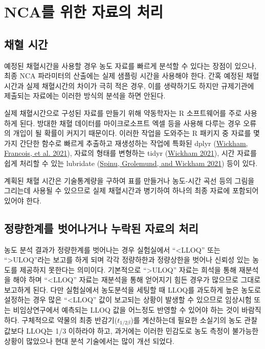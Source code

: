 \documentclass[
  11pt,
  krantz2, a4paper, twoside]{krantz}
\theoremstyle{definition}
\theoremstyle{definition}
\theoremstyle{definition}
\theoremstyle{definition}
\theoremstyle{remark}
\begin{document}
\hypertarget{data-prep}{%
\section{NCA를 위한 자료의 처리}\label{data-prep}}

\hypertarget{uxcc44uxd608-uxc2dcuxac04}{%
\subsection{채혈 시간}\label{uxcc44uxd608-uxc2dcuxac04}}

예정된 채혈시간을 사용할 경우 농도 자료를 빠르게 분석할 수 있다는 장점이 있으나, 최종 NCA 파라미터의 산출에는 실제 샘플링 시간을 사용해야 한다. 간혹 예정된 채혈시간과 실제 채혈시간의 차이가 극히 적은 경우, 이를 생략하기도 하지만 규제기관에 제출되는 자료에는 이러한 방식의 분석을 하면 안된다.

실제 채혈시간으로 구성된 자료를 만들기 위해 약동학자는 R 소프트웨어를 주로 사용하게 된다. 방대한 채혈 데이터를 마이크로소프트 엑셀 등을 사용해 다루는 경우 오류의 개입이 될 확률이 커지기 때문이다. 이러한 작업을 도와주는 R 패키지 중 자료를 몇가지 간단한 함수로 빠르게 추출하고 재생성하는 작업에 특화된 dplyr (\protect\hyperlink{ref-R-dplyr}{Wickham, Francois, et al. 2021}), 자료의 형태를 변형하는 tidyr (\protect\hyperlink{ref-R-tidyr}{Wickham 2021}), 시간 자료를 쉽게 처리할 수 있는 lubridate (\protect\hyperlink{ref-R-lubridate}{Spinu, Grolemund, and Wickham 2021}) 등이 있다. 

계획된 채혈 시간은 기술통계량을 구하여 표를 만들거나 농도-시간 곡선 등의 그림을 그리는데 사용될 수 있으므로 실제 채혈시간과 병기하여 하나의 최종 자료에 포함되어 있어야 한다.

\hypertarget{uxc815uxb7c9uxd55cuxacc4uxb97c-uxbc97uxc5b4uxb098uxac70uxb098-uxb204uxb77duxb41c-uxc790uxb8ccuxc758-uxcc98uxb9ac}{%
\subsection{정량한계를 벗어나거나 누락된 자료의 처리}\label{uxc815uxb7c9uxd55cuxacc4uxb97c-uxbc97uxc5b4uxb098uxac70uxb098-uxb204uxb77duxb41c-uxc790uxb8ccuxc758-uxcc98uxb9ac}}

농도 분석 결과가 정량한계를 벗어나는 경우 실험실에서 ``\textless LLOQ'' 또는 ``\textgreater ULOQ''라는 보고를 하게 되며 각각 정량하한과 정량상한을 벗어나 신뢰성 있는 농도를 제공하지 못한다는 의미이다. 기본적으로 ``\textgreater ULOQ'' 자료는 희석을 통해 재분석을 해야 하며 ``\textless LLOQ'' 자료는 재분석을 통해 얻어지기 힘든 경우가 많으므로 그대로 보고하게 된다. 다만 실험실에서 농도분석을 세팅할 때 LLOQ를 과도하게 높은 농도로 설정하는 경우 많은 ``\textless LLOQ'' 값이 보고되는 상황이 발생할 수 있으므로 임상시험 또는 비임상연구에서 예측되는 LLOQ 값을 어느정도 반영할 수 있어야 하는 것이 바람직하다. 구체적으로 약물의 최종 반감기(\(t_{1/2\beta}\))를 계산하는데 필요한 소실기의 농도 관찰값보다 LLOQ는 1/3 이하라야 하고, 과거에는 이러한 민감도로 농도 측정이 불가능한 상황이 많았으나 현대 분석 기술에서는 많이 개선 되었다.
\end{document}
